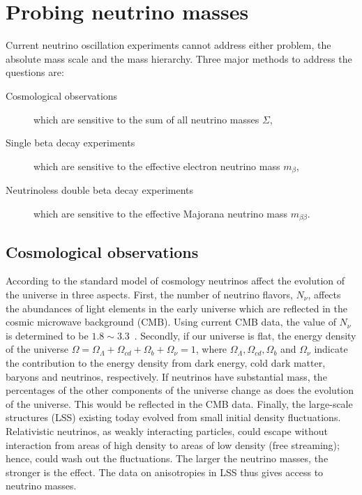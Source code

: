 \section{Probing neutrino masses}
\label{sec:pnm}
Current neutrino oscillation experiments cannot address either problem, the absolute mass scale and the mass hierarchy. Three major methods to address the questions are:
\begin{description}
\item[Cosmological observations] which are sensitive to the sum of all neutrino masses $\Sigma$,
\item[Single beta decay experiments] which are sensitive to the   effective electron neutrino mass $m_{\beta}$,
\item[Neutrinoless double beta decay experiments] which are sensitive   to the effective Majorana neutrino mass $m_{\beta\beta}$.
\end{description}

\subsection{Cosmological observations}
\label{sec:coob}
According to the standard model of cosmology neutrinos affect the evolution of the universe in three aspects. First, the number of neutrino flavors, $N_{\nu}$, affects the abundances of light elements in the early universe which are reflected in the cosmic microwave background (CMB). Using current CMB data, the value of $N_{\nu}$ is determined to be $1.8 \sim 3.3$~\cite{Oli02}. Secondly, if our universe is flat, the energy density of the universe $\Omega = \Omega_{\Lambda} + \Omega_{cd} + \Omega_{b} + \Omega_{\nu} = 1$, where $\Omega_{\Lambda}, \Omega_{cd}, \Omega_{b}$ and $\Omega_{\nu}$ indicate the contribution to the energy density from dark energy, cold dark matter, baryons and neutrinos, respectively. If neutrinos have substantial mass, the percentages of the other components of the universe change as does the evolution of the universe. This would be reflected in the CMB data. Finally, the large-scale structures (LSS) existing today evolved from small initial density fluctuations. Relativistic neutrinos, as weakly interacting particles, could escape without interaction from areas of high density to areas of low density (free streaming); hence, could wash out the  fluctuations. The larger the neutrino masses, the stronger is the effect. The data on anisotropies in LSS thus gives access to neutrino masses. 

